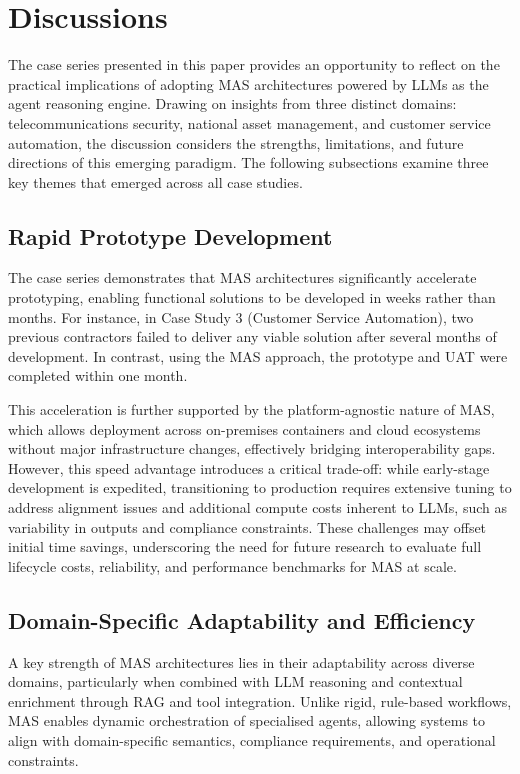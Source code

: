 \documentclass{article}
\begin{document}
\section{Discussions} \label{sec:discuss}

The case series presented in this paper provides an opportunity to reflect on the practical implications of adopting MAS architectures powered by LLMs as the agent reasoning engine. Drawing on insights from three distinct domains: telecommunications security, national asset management, and customer service automation, the discussion considers the strengths, limitations, and future directions of this emerging paradigm. The following subsections examine three key themes that emerged across all case studies.

\subsection{Rapid Prototype Development}

The case series demonstrates that MAS architectures significantly accelerate prototyping, enabling functional solutions to be developed in weeks rather than months. For instance, in Case Study 3 (Customer Service Automation), two previous contractors failed to deliver any viable solution after several months of development. In contrast, using the MAS approach, the prototype and UAT were completed within one month.

This acceleration is further supported by the platform-agnostic nature of MAS, which allows deployment across on-premises containers and cloud ecosystems without major infrastructure changes, effectively bridging interoperability gaps. However, this speed advantage introduces a critical trade-off: while early-stage development is expedited, transitioning to production requires extensive tuning to address alignment issues and additional compute costs inherent to LLMs, such as variability in outputs and compliance constraints. These challenges may offset initial time savings, underscoring the need for future research to evaluate full lifecycle costs, reliability, and performance benchmarks for MAS at scale.

\subsection{Domain-Specific Adaptability and Efficiency}

A key strength of MAS architectures lies in their adaptability across diverse domains, particularly when combined with LLM reasoning and contextual enrichment through RAG and tool integration. Unlike rigid, rule-based workflows, MAS enables dynamic orchestration of specialised agents, allowing systems to align with domain-specific semantics, compliance requirements, and operational constraints.
\end{document}
